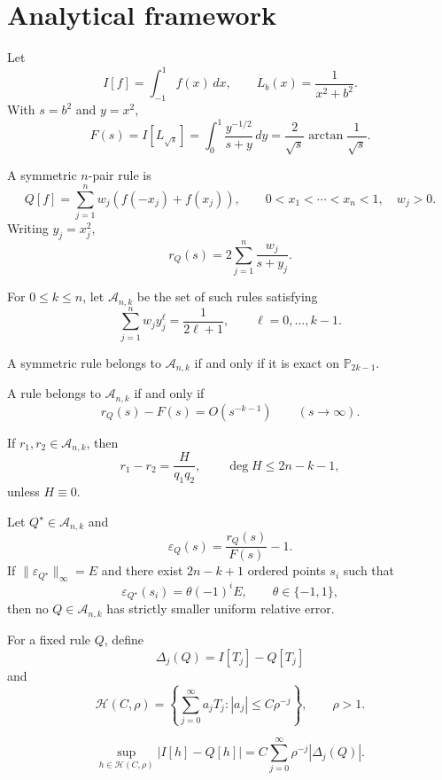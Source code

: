 \section{Analytical framework}

Let
\[
I[f]=\int_{-1}^{1}f(x)\,dx,\qquad
L_b(x)=\frac{1}{x^2+b^2}.
\]
With \(s=b^2\) and \(y=x^2\),
\[
F(s)=I[L_{\sqrt{s}}]
=\int_0^1\frac{y^{-1/2}}{s+y}\,dy
=\frac{2}{\sqrt{s}}\arctan\frac{1}{\sqrt{s}}.
\]

A symmetric \(n\)-pair rule is
\[
Q[f]=\sum_{j=1}^{n}w_j(f(-x_j)+f(x_j)),
\qquad 0<x_1<\cdots<x_n<1,\quad w_j>0.
\]
Writing \(y_j=x_j^2\),
\[
r_Q(s)=2\sum_{j=1}^{n}\frac{w_j}{s+y_j}.
\]

\begin{definition}
For \(0\le k\le n\), let \(\mathcal A_{n,k}\) be the set of such rules
satisfying
\[
\sum_{j=1}^{n}w_jy_j^\ell=\frac{1}{2\ell+1},
\qquad \ell=0,\ldots,k-1.
\]
\end{definition}

\begin{lemma}
A symmetric rule belongs to \(\mathcal A_{n,k}\) if and only if it is
exact on \(\mathbb P_{2k-1}\).
\end{lemma}

\begin{lemma}
A rule belongs to \(\mathcal A_{n,k}\) if and only if
\[
r_Q(s)-F(s)=O(s^{-k-1})
\qquad (s\to\infty).
\]
\end{lemma}

\begin{proposition}
If \(r_1,r_2\in\mathcal A_{n,k}\), then
\[
r_1-r_2=\frac{H}{q_1q_2},
\qquad
\deg H\le2n-k-1,
\]
unless \(H\equiv0\).
\end{proposition}

\begin{theorem}
Let \(Q^\star\in\mathcal A_{n,k}\) and
\[
\varepsilon_Q(s)=\frac{r_Q(s)}{F(s)}-1.
\]
If \(\|\varepsilon_{Q^\star}\|_\infty=E\) and there exist \(2n-k+1\)
ordered points \(s_i\) such that
\[
\varepsilon_{Q^\star}(s_i)=\theta(-1)^iE,
\qquad \theta\in\{-1,1\},
\]
then no \(Q\in\mathcal A_{n,k}\) has strictly smaller uniform relative
error.
\end{theorem}

For a fixed rule \(Q\), define
\[
\Delta_j(Q)=I[T_j]-Q[T_j]
\]
and
\[
\mathcal H(C,\rho)=
\left\{
\sum_{j=0}^{\infty}a_jT_j:
|a_j|\le C\rho^{-j}
\right\},
\qquad \rho>1.
\]

\begin{theorem}
\[
\sup_{h\in\mathcal H(C,\rho)}
|I[h]-Q[h]|
=
C\sum_{j=0}^{\infty}\rho^{-j}|\Delta_j(Q)|.
\]
\end{theorem}

